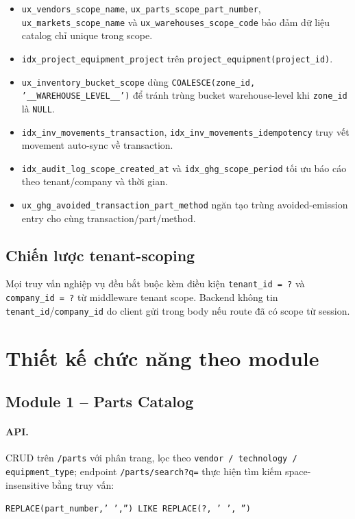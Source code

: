 \begin{itemize}[leftmargin=1.2cm]
    \item \texttt{ux\_vendors\_scope\_name}, \texttt{ux\_parts\_scope\_part\_number}, \texttt{ux\_markets\_scope\_name} và \texttt{ux\_warehouses\_scope\_code} bảo đảm dữ liệu catalog chỉ unique trong scope.
    \item \texttt{idx\_project\_equipment\_project} trên \texttt{project\_equipment(project\_id)}.
    \item \texttt{ux\_inventory\_bucket\_scope} dùng \texttt{COALESCE(zone\_id, '\_\_WAREHOUSE\_LEVEL\_\_')} để tránh trùng bucket warehouse-level khi \texttt{zone\_id} là \texttt{NULL}.
    \item \texttt{idx\_inv\_movements\_transaction}, \texttt{idx\_inv\_movements\_idempotency} truy vết movement auto-sync về transaction.
    \item \texttt{idx\_audit\_log\_scope\_created\_at} và \texttt{idx\_ghg\_scope\_period} tối ưu báo cáo theo tenant/company và thời gian.
    \item \texttt{ux\_ghg\_avoided\_transaction\_part\_method} ngăn tạo trùng avoided-emission entry cho cùng transaction/part/method.
\end{itemize}

\subsection{Chiến lược tenant-scoping}
Mọi truy vấn nghiệp vụ đều bắt buộc kèm điều kiện \texttt{tenant\_id = ?} và \texttt{company\_id = ?} từ middleware tenant scope. Backend không tin \texttt{tenant\_id}/\texttt{company\_id} do client gửi trong body nếu route đã có scope từ session.

\section{Thiết kế chức năng theo module}
\label{sec:modules}

\subsection{Module 1 -- Parts Catalog}
\paragraph{API.} CRUD trên \texttt{/parts} với phân trang, lọc theo \texttt{vendor / technology / equipment\_type}; endpoint \texttt{/parts/search?q=} thực hiện tìm kiếm space-insensitive bằng truy vấn:
\begin{center}
\texttt{REPLACE(part\_number,' ','') LIKE REPLACE(?, ' ', '')}
\end{center}

